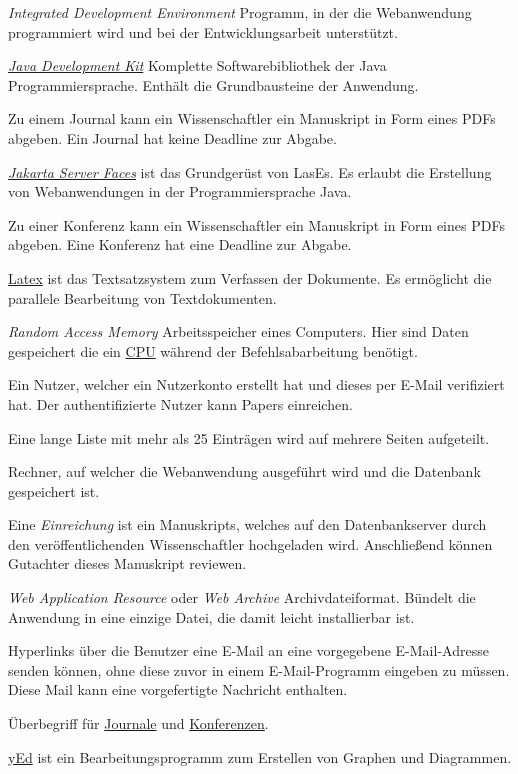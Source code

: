 \begin{description}
	 \emph{Integrated Development Environment} Programm, in der die Webanwendung programmiert wird und bei der Entwicklungsarbeit unterstützt.

	 \href{https://www.oracle.com/java/technologies/downloads/}{\emph{Java Development Kit}} Komplette Softwarebibliothek der Java Programmiersprache. Enthält die Grundbausteine der Anwendung.

	 Zu einem Journal kann ein Wissenschaftler ein Manuskript in Form eines PDFs abgeben. Ein Journal hat keine Deadline zur Abgabe.

	 \href{https://jakarta.ee/specifications/faces/}{\emph{Jakarta Server Faces}} ist das Grundgerüst von LasEs. Es erlaubt die Erstellung von Webanwendungen in der Programmiersprache Java.

	 Zu einer Konferenz kann ein Wissenschaftler ein Manuskript in Form eines PDFs abgeben. Eine Konferenz hat eine Deadline zur Abgabe.

	 \href{https://www.latex-project.org/}{Latex} ist das Textsatzsystem zum Verfassen der Dokumente. Es ermöglicht die parallele Bearbeitung von Textdokumenten.

	 \emph{Random Access Memory} Arbeitsspeicher eines Computers. Hier sind Daten gespeichert die ein \hyperref[glo:cpu]{CPU} während der Befehlsabarbeitung benötigt.

	 Ein Nutzer, welcher ein Nutzerkonto erstellt hat und dieses per E-Mail verifiziert hat. Der authentifizierte Nutzer kann Papers einreichen.

	 Eine lange Liste mit mehr als 25 Einträgen wird auf mehrere Seiten aufgeteilt.

	 Rechner, auf welcher die Webanwendung ausgeführt wird und die Datenbank gespeichert ist.

	 Eine \emph{Einreichung} ist ein Manuskripts, welches auf den Datenbankserver durch den veröffentlichenden Wissenschaftler hochgeladen wird. Anschließend können Gutachter dieses Manuskript reviewen.

	 \emph{Web Application Resource} oder \emph{Web Archive} Archivdateiformat. Bündelt die Anwendung in eine einzige Datei, die damit leicht installierbar ist.

	 Hyperlinks über die Benutzer eine E-Mail an eine vorgegebene E-Mail-Adresse senden können, ohne diese zuvor in einem E-Mail-Programm eingeben zu müssen. Diese Mail kann eine vorgefertigte Nachricht enthalten.

	 Überbegriff für \hyperref[glo:journal]{Journale} und \hyperref[glo:konf]{Konferenzen}.

	 \href{https://www.yworks.com/products/yed}{yEd} ist ein Bearbeitungsprogramm zum Erstellen von Graphen und Diagrammen.
\end{description}